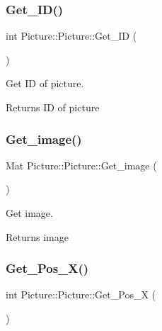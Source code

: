 \subsubsection{\texorpdfstring{Get\+\_\+\+I\+D()}{Get\_ID()}}
{\footnotesize\ttfamily int Picture\+::\+Picture\+::\+Get\+\_\+\+ID (\begin{DoxyParamCaption}{ }\end{DoxyParamCaption})\hspace{0.3cm}{\ttfamily [inline]}}



Get ID of picture. 

\begin{DoxyReturn}{Returns}
ID of picture 
\end{DoxyReturn}
\mbox{\label{class_picture_1_1_picture_a44b9bb7df596902509eb8fb41c24d38e}} 
\subsubsection{\texorpdfstring{Get\+\_\+image()}{Get\_image()}}
{\footnotesize\ttfamily Mat Picture\+::\+Picture\+::\+Get\+\_\+image (\begin{DoxyParamCaption}{ }\end{DoxyParamCaption})\hspace{0.3cm}{\ttfamily [inline]}}



Get image. 

\begin{DoxyReturn}{Returns}
image 
\end{DoxyReturn}
\mbox{\label{class_picture_1_1_picture_a827efae2ce4832dbbdc8877ac3c175b8}} 
\subsubsection{\texorpdfstring{Get\+\_\+\+Pos\+\_\+\+X()}{Get\_Pos\_X()}}
{\footnotesize\ttfamily int Picture\+::\+Picture\+::\+Get\+\_\+\+Pos\+\_\+X (\begin{DoxyParamCaption}{ }\end{DoxyParamCaption})\hspace{0.3cm}{\ttfamily [inline]}}



